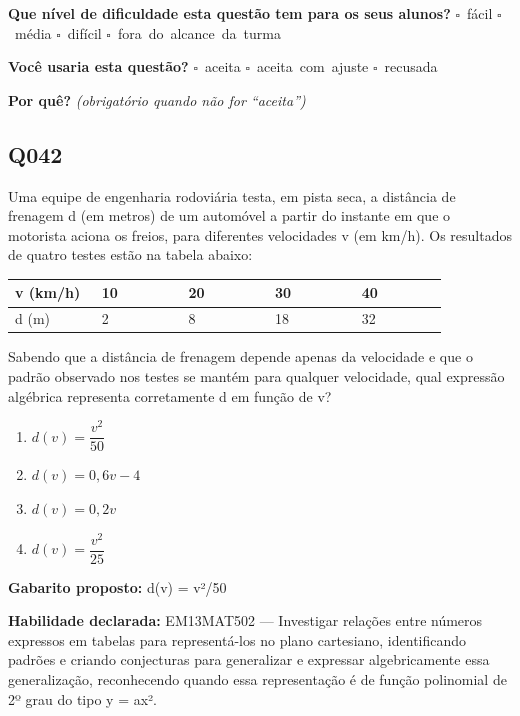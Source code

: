 \documentclass[11pt,a4paper]{article}
\begin{document}
\textbf{Que nível de dificuldade esta questão tem para os seus alunos?}\quad
\mbox{$\square$~fácil} \quad \mbox{$\square$~média} \quad
\mbox{$\square$~difícil} \quad \mbox{$\square$~fora do alcance da turma}

\textbf{Você usaria esta questão?}\quad
\mbox{$\square$~aceita} \quad \mbox{$\square$~aceita com ajuste} \quad
\mbox{$\square$~recusada}

\textbf{Por quê?} \emph{(obrigatório quando não for ``aceita'')}

\underline{\hspace{\linewidth}}

\underline{\hspace{\linewidth}}
\vspace{0.6em}

\begin{samepage}
\subsection*{Q042}
Uma equipe de engenharia rodoviária testa, em pista seca, a distância de frenagem d (em metros) de um automóvel a partir do instante em que o motorista aciona os freios, para diferentes velocidades v (em km/h). Os resultados de quatro testes estão na tabela abaixo:

\begin{center}
\begin{tabular}{|p{0.172\linewidth}|p{0.172\linewidth}|p{0.172\linewidth}|p{0.172\linewidth}|p{0.172\linewidth}|}
\hline
\textbf{v (km/h)} & \textbf{10} & \textbf{20} & \textbf{30} & \textbf{40} \\
\hline
d (m) & 2 & 8 & 18 & 32 \\
\hline
\end{tabular}
\end{center}

Sabendo que a distância de frenagem depende apenas da velocidade e que o padrão observado nos testes se mantém para qualquer velocidade, qual expressão algébrica representa corretamente d em função de v?
\begin{enumerate}[label=(\alph*),nosep,leftmargin=*]
\item $d(v) = \dfrac{v^2}{50}$
\item $d(v) = 0{,}6v - 4$
\item $d(v) = 0{,}2v$
\item $d(v) = \dfrac{v^2}{25}$
\end{enumerate}

\textbf{Gabarito proposto:} d(v) = v²/50

\textbf{Habilidade declarada:} EM13MAT502 --- Investigar relações entre números expressos em tabelas para representá-los no plano cartesiano, identificando padrões e criando conjecturas para generalizar e expressar algebricamente essa generalização, reconhecendo quando essa representação é de função polinomial de 2º grau do tipo y = ax².
\end{samepage}
\end{document}
